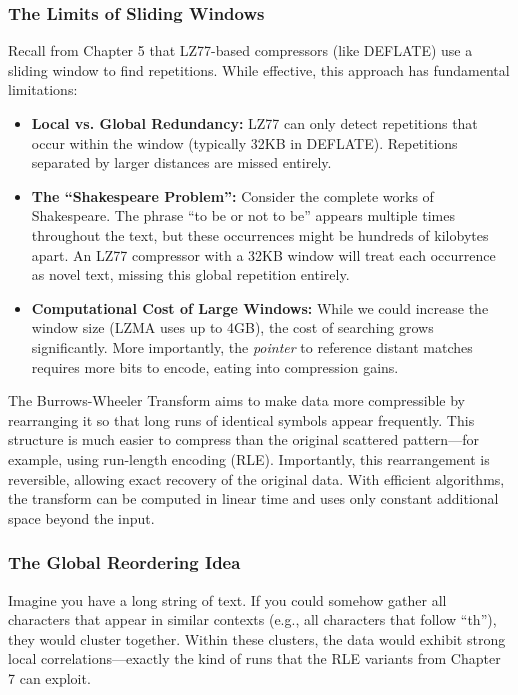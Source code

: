 \subsubsection{The Limits of Sliding Windows}

Recall from Chapter 5 that LZ77-based compressors (like DEFLATE) use a sliding window to find repetitions. While effective, this approach has fundamental limitations:

\begin{itemize}
    \item \textbf{Local vs. Global Redundancy:} LZ77 can only detect repetitions that occur within the window (typically 32KB in DEFLATE). Repetitions separated by larger distances are missed entirely.
    
    \item \textbf{The ``Shakespeare Problem'':} Consider the complete works of Shakespeare. The phrase ``to be or not to be'' appears multiple times throughout the text, but these occurrences might be hundreds of kilobytes apart. An LZ77 compressor with a 32KB window will treat each occurrence as novel text, missing this global repetition entirely.
    
    \item \textbf{Computational Cost of Large Windows:} While we could increase the window size (LZMA uses up to 4GB), the cost of searching grows significantly. More importantly, the \emph{pointer} to reference distant matches requires more bits to encode, eating into compression gains.
\end{itemize}

\begin{importantbox}
The Burrows-Wheeler Transform aims to make data more compressible by rearranging it so that long runs of identical symbols appear frequently. This structure is much easier to compress than the original scattered pattern—for example, using run-length encoding (RLE). Importantly, this rearrangement is reversible, allowing exact recovery of the original data. With efficient algorithms, the transform can be computed in linear time and uses only constant additional space beyond the input.
\end{importantbox}

\subsubsection{The Global Reordering Idea}

Imagine you have a long string of text. If you could somehow gather all characters that appear in similar contexts (e.g., all characters that follow ``th''), they would cluster together. Within these clusters, the data would exhibit strong local correlations—exactly the kind of runs that the RLE variants from Chapter 7 can exploit.

